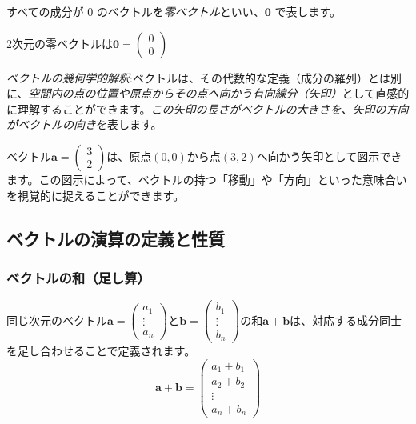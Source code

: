 \begin{dfn}[零ベクトル] \label{vector_zero}
すべての成分が $0$ のベクトルを\emph{零ベクトル}といい、$\bm{0}$ で表します。
\end{dfn}

\begin{ex}
2次元の零ベクトルは$\bm{0} = \begin{pmatrix} 0 \\ 0 \end{pmatrix}$
\end{ex}

\emph{ベクトルの幾何学的解釈}:ベクトルは、その代数的な定義（成分の羅列）とは別に、\emph{空間内の点の位置や原点からその点へ向かう有向線分（矢印）}として直感的に理解することができます。\emph{この矢印の長さがベクトルの大きさを、矢印の方向がベクトルの向き}を表します。

\begin{ex}
ベクトル$\bm{a} = \begin{pmatrix} 3 \\ 2 \end{pmatrix}$は、原点$(0,0)$から点$(3,2)$へ向かう矢印として図示できます。この図示によって、ベクトルの持つ「移動」や「方向」といった意味合いを視覚的に捉えることができます。
\end{ex}

\subsection{ベクトルの演算の定義と性質}

\subsubsection{ベクトルの和（足し算）}

\begin{dfn}[ベクトルの和] \label{vector_sum}
同じ次元のベクトル$\bm{a}=\begin{pmatrix} a_1 \\ \vdots \\ a_n \end{pmatrix}$と$\bm{b}=\begin{pmatrix} b_1 \\ \vdots \\ b_n \end{pmatrix}$の和$\bm{a}+\bm{b}$は、対応する成分同士を足し合わせることで定義されます。
\[\bm{a} + \bm{b} = \begin{pmatrix} a_1 + b_1 \\ a_2 + b_2 \\ \vdots \\ a_n + b_n \end{pmatrix}\]
\end{dfn}

